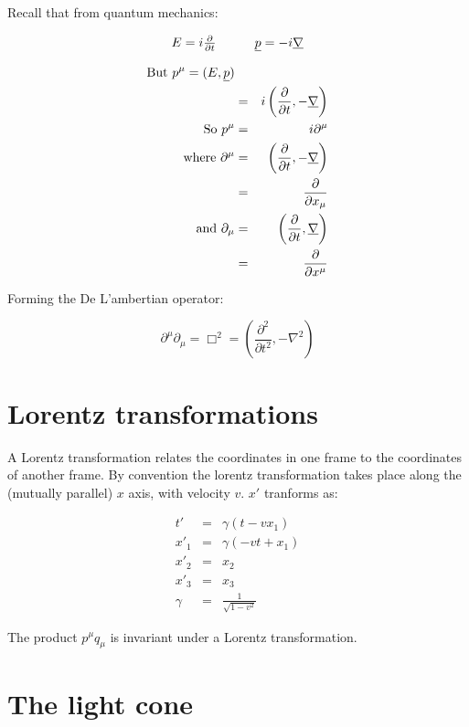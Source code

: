 Recall that from quantum mechanics:

\[
  \begin{array}{ccc}
  E = i\frac{\partial}{\partial t} & \quad & \underline{p} = -i \underline{\nabla}
  \end{array}
\]

\begin{eqnarray*}
  \textrm{But } p^{\mu} = (E,\underline{p}) \\
  & = & i\left( \frac{\partial}{\partial t},-\underline{\nabla}\right) \\
  \textrm{So } p^{\mu} & = & i\partial^{\mu} \\
  \textrm{where } \partial^{\mu} & = & \left(\frac{\partial}{\partial t},-\underline{\nabla}\right) \\
  & = & \frac{\partial}{\partial x_{\mu}} \\
  \textrm{and } \partial_{\mu} & = & \left( \frac{\partial}{\partial t}, \underline{\nabla}\right) \\
  & = & \frac{\partial}{\partial x^{\mu}}
\end{eqnarray*}

Forming the De L'ambertian operator:

\[
  \partial^{\mu}\partial_{\mu} = \Box^2 = \left(\frac{\partial^2}{\partial t^2}, -\nabla^2\right)
\]

\section{Lorentz transformations}

A Lorentz transformation relates the coordinates in one frame to the coordinates of another frame.  By convention the lorentz transformation takes place along the (mutually parallel) $x$ axis, with velocity $v$.  $x'$ tranforms as:

\begin{eqnarray*}
  t'   & = & \gamma (t - vx_1)  \\
  x'_1 & = & \gamma (-vt + x_1) \\
  x'_2 & = & x_2 \\
  x'_3 & = & x_3 \\
  \gamma & = & \frac{1}{\sqrt{1-v^2}}
\end{eqnarray*}

The product $p^{\mu}q_{\mu}$ is invariant under a Lorentz transformation.

\section{The light cone}

